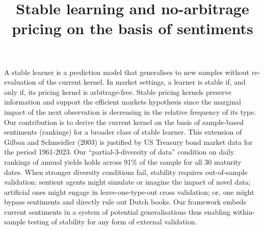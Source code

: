 \documentclass{article}
\begin{document}
\title{Stable learning and no-arbitrage pricing on the basis of sentiments}
  A stable learner is a prediction model that generalises to new samples without re-evaluation of the current kernel.  In market settings, a learner
  is stable if, and only if, its pricing kernel is arbitrage-free.  Stable pricing 
  kernels preserve information and support the efficient markets hypothesis
  since the marginal impact of the next observation is decreasing in the relative
  frequency of its type. Our contribution is to derive the current kernel on the
  basis of sample-based sentiments (rankings) for a broader class of stable learner.  
  This extension of Gilboa and
  Schmeidler (2003) is justified by US Treasury bond market data for the period
  1961-2023. Our ``partial-3-diversity of data'' condition on daily rankings of 
  annual yields holds across 91\% of the sample for all 30 maturity dates.  When
  stronger diversity conditions fail, stability requires out-of-sample validation:
  sentient agents might simulate or imagine the impact of novel data; artificial
  ones might engage in leave-one-type-out cross validation; or, one might bypass sentiments and directly rule out Dutch books. Our
  framework embeds current sentiments in a system of potential generalisations
  thus enabling within-sample testing of stability for any form of external validation.
\end{document}
